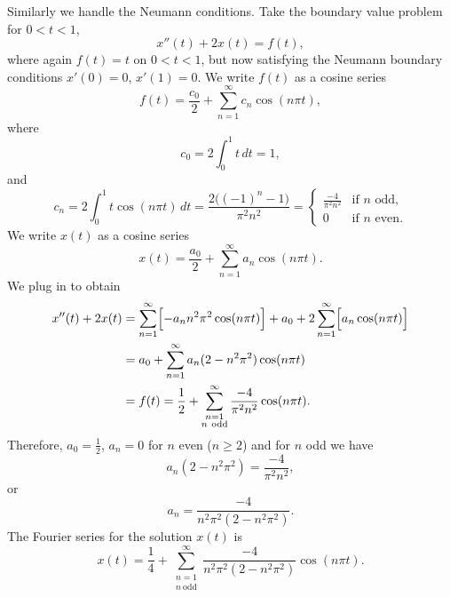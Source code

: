 \begin{example}
Similarly we handle the Neumann conditions.
Take the boundary value problem for $0 < t < 1$,
\begin{equation*}
x''(t) + 2 x(t) = f(t) ,
\end{equation*}
where again $f(t) = t$ on $0 < t < 1$, but now satisfying
the Neumann boundary conditions
$x'(0) = 0$, $x'(1)=0$.
We write $f(t)$ as a cosine series
\begin{equation*}
f(t) = \frac{c_0}{2} + \sum_{n=1}^\infty c_n \cos (n \pi t) ,
\end{equation*}
where
\begin{equation*}
c_0 = 2 \int_0^1 t \,dt = 1 ,
\end{equation*}
and
\begin{equation*}
c_n = 2 \int_0^1 t \cos (n \pi t) \,dt =
\frac{2\bigl({(-1)}^n-1\bigr)}{\pi^2 n^2} = 
\begin{cases}
\frac{-4}{\pi^2 n^2} & \text{if } n \text{ odd} , \\
0 & \text{if } n \text{ even}.
\end{cases}
\end{equation*}
We write $x(t)$ as a cosine series
\begin{equation*}
x(t) = \frac{a_0}{2} + \sum_{n=1}^\infty a_n \cos (n \pi t) .
\end{equation*}
We plug in to obtain 
\begin{equation*}
\begin{split}
x''(t) + 2 x(t) & =
\sum_{n=1}^\infty \Bigl[ - a_n n^2 \pi^2 \cos (n \pi t) \Bigr]
+
a_0 +
2
\sum_{n=1}^\infty \Bigl[ a_n \cos (n \pi t) \Bigr]
\\
& =
a_0 +
\sum_{n=1}^\infty a_n (2 - n^2 \pi^2 ) \cos (n \pi t)
\\
& = f(t)
=
\frac{1}{2} +
\sum_{\substack{n=1\\n~\text{odd}}}^\infty
\frac{-4}{\pi^2 n^2} \cos (n \pi t) .
\end{split}
\end{equation*}
Therefore, $a_0 = \frac{1}{2}$, $a_n = 0$ for $n$ even ($n \geq 2$) and for
$n$ odd we have
\begin{equation*}
a_n (2 - n^2 \pi^2)
=
\frac{-4}{\pi^2 n^2} ,
\end{equation*}
or
\begin{equation*}
a_n
=
\frac{-4}{n^2 \pi^2 (2 - n^2 \pi^2)} .
\end{equation*}
The Fourier series for the solution $x(t)$ is
\begin{equation*}
x(t) = 
\frac{1}{4} +
\sum_{\substack{n=1\\n~\text{odd}}}^\infty
\frac{-4}{n^2 \pi^2 (2 - n^2 \pi^2)} 
\cos (n \pi t) .
\end{equation*}
\end{example}

